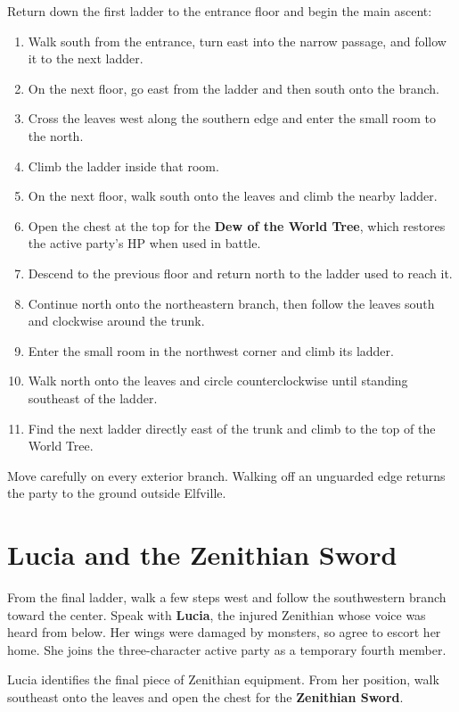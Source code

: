 \documentclass[
  american,
  10pt,
  letterpaper,
  oneside,
  open=any]{scrreprt}
\providecommand{\tightlist}{%
  \setlength{\itemsep}{0pt}\setlength{\parskip}{0pt}}
\begin{document}
Return down the first ladder to the entrance floor and begin the main
ascent:

\begin{enumerate}
\def\labelenumi{\arabic{enumi}.}
\tightlist
\item
  Walk south from the entrance, turn east into the narrow passage, and
  follow it to the next ladder.
\item
  On the next floor, go east from the ladder and then south onto the
  branch.
\item
  Cross the leaves west along the southern edge and enter the small room
  to the north.
\item
  Climb the ladder inside that room.
\item
  On the next floor, walk south onto the leaves and climb the nearby
  ladder.
\item
  Open the chest at the top for the \textbf{Dew of the World Tree},
  which restores the active party's HP when used in battle.
\item
  Descend to the previous floor and return north to the ladder used to
  reach it.
\item
  Continue north onto the northeastern branch, then follow the leaves
  south and clockwise around the trunk.
\item
  Enter the small room in the northwest corner and climb its ladder.
\item
  Walk north onto the leaves and circle counterclockwise until standing
  southeast of the ladder.
\item
  Find the next ladder directly east of the trunk and climb to the top
  of the World Tree.
\end{enumerate}

Move carefully on every exterior branch. Walking off an unguarded edge
returns the party to the ground outside Elfville.

\section{Lucia and the Zenithian
Sword}\label{lucia-and-the-zenithian-sword}

From the final ladder, walk a few steps west and follow the southwestern
branch toward the center. Speak with \textbf{Lucia}, the injured
Zenithian whose voice was heard from below. Her wings were damaged by
monsters, so agree to escort her home. She joins the three-character
active party as a temporary fourth member.

Lucia identifies the final piece of Zenithian equipment. From her
position, walk southeast onto the leaves and open the chest for the
\textbf{Zenithian Sword}.
\end{document}
